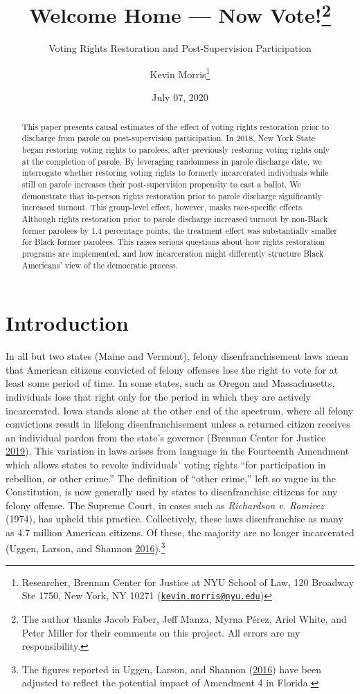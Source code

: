 \documentclass[
  12pt,
]{article}
\title{Welcome Home --- Now Vote!\thanks{The author thanks Jacob Faber, Jeff Manza, Myrna Pérez, Ariel White, and Peter Miller for their comments on this project. All errors are my responsibility.}}
\subtitle{Voting Rights Restoration and Post-Supervision Participation}
\author{Kevin Morris\footnote{Researcher, Brennan Center for Justice at NYU School of Law, 120 Broadway Ste 1750, New York, NY 10271 (\href{mailto:kevin.morris@nyu.edu}{\nolinkurl{kevin.morris@nyu.edu}})}}
\date{July 07, 2020}
\begin{document}
\maketitle
\begin{abstract}
This paper presents causal estimates of the effect of voting rights restoration prior to discharge from parole on post-supervision participation. In 2018, New York State began restoring voting rights to parolees, after previously restoring voting rights only at the completion of parole. By leveraging randomness in parole discharge date, we interrogate whether restoring voting rights to formerly incarcerated individuals while still on parole increases their post-supervision propensity to cast a ballot. We demonstrate that in-person rights restoration prior to parole discharge significantly increased turnout. This group-level effect, however, masks race-specific effects. Although rights restoration prior to parole discharge increased turnout by non-Black former parolees by 1.4 percentage points, the treatment effect was substantially smaller for Black former parolees. This raises serious questions about how rights restoration programs are implemented, and how incarceration might differently structure Black Americans' view of the democratic process.
\end{abstract}

\pagebreak
\doublespacing


\hypertarget{introduction}{%
\section*{Introduction}\label{introduction}}

In all but two states (Maine and Vermont), felony disenfranchisement laws mean that American citizens convicted of felony offenses lose the right to vote for at least some period of time. In some states, such as Oregon and Massachusetts, individuals lose that right only for the period in which they are actively incarcerated. Iowa stands alone at the other end of the spectrum, where all felony convictions result in lifelong disenfranchisement unless a returned citizen receives an individual pardon from the state's governor (Brennan Center for Justice \protect\hyperlink{ref-bcj_laws}{2019}). This variation in laws arises from language in the Fourteenth Amendment which allows states to revoke individuals' voting rights ``for participation in rebellion, or other crime.'' The definition of ``other crime,'' left so vague in the Constitution, is now generally used by states to disenfranchise citizens for any felony offense. The Supreme Court, in cases such as \emph{Richardson v. Ramirez} (1974), has upheld this practice. Collectively, these laws disenfranchise as many as 4.7 million American citizens. Of these, the majority are no longer incarcerated (Uggen, Larson, and Shannon \protect\hyperlink{ref-sentencing_2016}{2016}).\footnote{The figures reported in Uggen, Larson, and Shannon (\protect\hyperlink{ref-sentencing_2016}{2016}) have been adjusted to reflect the potential impact of Amendment 4 in Florida.}
\end{document}
